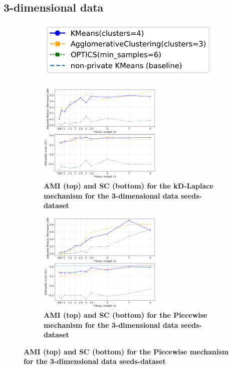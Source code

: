 \subsection{3-dimensional data}
\begin{figure}[H]
    \centering
    \begin{subfigure}{0.30\textwidth}
        \includegraphics[width=\textwidth]{Results/kd-laplace/kd-Laplace/seeds-dataset/legend_3.png}
    \end{subfigure}
    \begin{subfigure}{1\textwidth}
        \caption{\textbf{AMI (top) and SC (bottom) for the kD-Laplace mechanism for the 3-dimensional data seeds-dataset}}
        \centering
        \includegraphics[width=0.65\textwidth]{Results/kd-laplace/kd-Laplace/seeds-dataset/ami-and-sc_3_dimensions.png}
        \centering
    \end{subfigure}
    \begin{subfigure}{1\textwidth}
        \caption{\textbf{AMI (top) and SC (bottom) for the Piecewise mechanism for the 3-dimensional data seeds-dataset}}
        \centering
        \includegraphics[width=0.65\textwidth]{Results/kd-laplace/piecewise/seeds-dataset/ami-and-sc_3_dimensions.png}
    \end{subfigure}
    \label{fig:validation-seeds-dataset_comparison_3d-laplace}
\end{figure}
